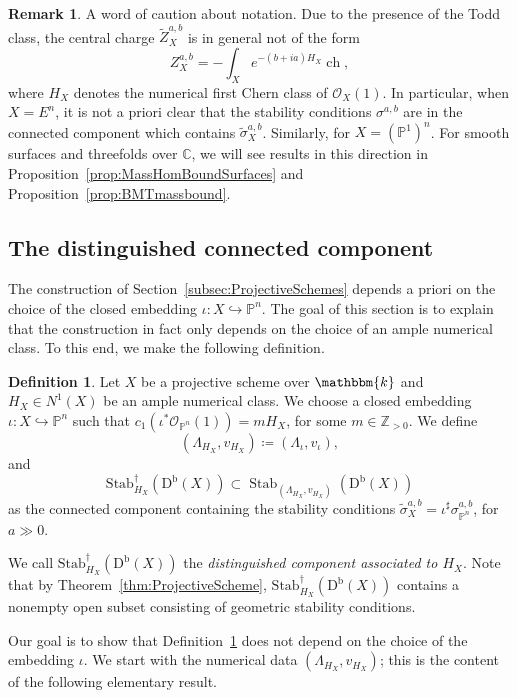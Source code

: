 \documentclass[11pt, reqno]{amsart}
\numberwithin{equation}{section}
\theoremstyle{plain}
\theoremstyle{remark}
\theoremstyle{definition}
\newtheorem{definition}[theorem]{Definition}
\newtheorem{remark}[theorem]{Remark}
\theoremstyle{italicsname}
\newcommand{\Db}{\mathrm{D^b}}
\DeclareMathOperator{\Stab}{Stab}
\newcommand{\Stabdagger}{\mathrm{Stab}^\dagger}
\DeclareMathOperator{\ch}{{ch}}
\newcommand{\cO}{\mathcal{O}}
\newcommand{\KK}{\mathbbm{k}}
\def\CC{\ensuremath{\mathbb{C}}}
\def\ZZ{\ensuremath{\mathbb{Z}}}
\def\PP{\ensuremath{\mathbb{P}}}
\begin{document}
\begin{remark}\label{rmk:CompatibilityEn}
A word of caution about notation.
Due to the presence of the Todd class, the central charge $\widetilde{Z}_{X}^{a,b}$ is in general not of the form
\[
Z_X^{a,b}=-\int_X e^{-(b+ia)H_X}\ch,
\]
where $H_X$ denotes the numerical first Chern class of $\cO_X(1)$.
In particular, when $X=E^n$, it is not a priori clear that the stability conditions $\sigma^{a,b}$ are in the connected component which contains $\widetilde{\sigma}_{X}^{a,b}$.
Similarly, for $X=(\PP^1)^n$.
For smooth surfaces and threefolds over $\CC$, we will see results in this direction in Proposition~\ref{prop:MassHomBoundSurfaces} and Proposition~\ref{prop:BMTmassbound}.
\end{remark}


\subsection{The distinguished connected component}\label{subsec:ConnectedComponent}

The construction of Section~\ref{subsec:ProjectiveSchemes} depends a priori on the choice of the closed embedding $\iota \colon X \hookrightarrow \PP^n$.
The goal of this section is to explain that the construction in fact only depends on the choice of an ample numerical class. 
To this end, we make the following definition.

\begin{definition}\label{def:StabdaggerAbsolute}
Let $X$ be a projective scheme over $\KK$ and $H_X\in N^1(X)$ be an ample numerical class.
We choose a closed embedding $\iota\colon X\hookrightarrow\PP^n$ such that $c_1(\iota^*\cO_{\PP^n}(1))=mH_X$, for some $m\in\ZZ_{>0}$.
We define
\[
(\Lambda_{H_X},v_{H_X})\coloneqq(\Lambda_{\iota},v_{\iota}),
\]
and
\[
\Stabdagger_{H_X}(\Db(X))\subset\Stab_{(\Lambda_{H_X},v_{H_X})}(\Db(X))
\]
as the connected component containing the stability conditions $\widetilde{\sigma}_{X}^{a,b}=\iota^\sharp\sigma_{\PP^n}^{a,b}$, for $a\gg0$.
\end{definition}

We call $\Stabdagger_{H_X}(\Db(X))$ the \emph{distinguished component associated to $H_X$}.
Note that by Theorem~\ref{thm:ProjectiveScheme}, $\Stabdagger_{H_X}(\Db(X))$ contains a nonempty open subset consisting of geometric stability conditions. 

Our goal is to show that Definition~\ref{def:StabdaggerAbsolute} does not depend on the choice of the embedding $\iota$. 
We start with the numerical data $(\Lambda_{H_X},v_{H_X})$; this is the content of the following elementary result.
\end{document}
